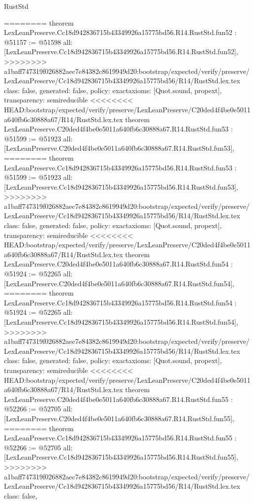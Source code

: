 \begin{lexlean}{RustStd}
\begin{coremodule}
{\begin{coremodule}
{{{{{{{{{{{{{{{{{{{{{{{{{{{{{{{{{{{{{{{{{{{{{{{{{{{{{{{========
theorem LexLeanPreserve.Cc18d942836715b43349926a15775bd56.R14.RustStd.fun52 : @51157 := @51598 {
  all: [LexLeanPreserve.Cc18d942836715b43349926a15775bd56.R14.RustStd.fun52],
>>>>>>>> a1baff747319f026882aec7e84382c8619949d20:bootstrap/expected/verify/preserve/LexLeanPreserve/Cc18d942836715b43349926a15775bd56/R14/RustStd.lex.tex
  class: false,
  generated: false,
  policy: exact{axioms: [Quot.sound, propext]},
  transparency: semireducible
}
<<<<<<<< HEAD:bootstrap/expected/verify/preserve/LexLeanPreserve/C20ded4f4be0e5011a640fb6c30888a67/R14/RustStd.lex.tex
theorem LexLeanPreserve.C20ded4f4be0e5011a640fb6c30888a67.R14.RustStd.fun53 : @51599 := @51923 {
  all: [LexLeanPreserve.C20ded4f4be0e5011a640fb6c30888a67.R14.RustStd.fun53],
========
theorem LexLeanPreserve.Cc18d942836715b43349926a15775bd56.R14.RustStd.fun53 : @51599 := @51923 {
  all: [LexLeanPreserve.Cc18d942836715b43349926a15775bd56.R14.RustStd.fun53],
>>>>>>>> a1baff747319f026882aec7e84382c8619949d20:bootstrap/expected/verify/preserve/LexLeanPreserve/Cc18d942836715b43349926a15775bd56/R14/RustStd.lex.tex
  class: false,
  generated: false,
  policy: exact{axioms: [Quot.sound, propext]},
  transparency: semireducible
}
<<<<<<<< HEAD:bootstrap/expected/verify/preserve/LexLeanPreserve/C20ded4f4be0e5011a640fb6c30888a67/R14/RustStd.lex.tex
theorem LexLeanPreserve.C20ded4f4be0e5011a640fb6c30888a67.R14.RustStd.fun54 : @51924 := @52265 {
  all: [LexLeanPreserve.C20ded4f4be0e5011a640fb6c30888a67.R14.RustStd.fun54],
========
theorem LexLeanPreserve.Cc18d942836715b43349926a15775bd56.R14.RustStd.fun54 : @51924 := @52265 {
  all: [LexLeanPreserve.Cc18d942836715b43349926a15775bd56.R14.RustStd.fun54],
>>>>>>>> a1baff747319f026882aec7e84382c8619949d20:bootstrap/expected/verify/preserve/LexLeanPreserve/Cc18d942836715b43349926a15775bd56/R14/RustStd.lex.tex
  class: false,
  generated: false,
  policy: exact{axioms: [Quot.sound, propext]},
  transparency: semireducible
}
<<<<<<<< HEAD:bootstrap/expected/verify/preserve/LexLeanPreserve/C20ded4f4be0e5011a640fb6c30888a67/R14/RustStd.lex.tex
theorem LexLeanPreserve.C20ded4f4be0e5011a640fb6c30888a67.R14.RustStd.fun55 : @52266 := @52705 {
  all: [LexLeanPreserve.C20ded4f4be0e5011a640fb6c30888a67.R14.RustStd.fun55],
========
theorem LexLeanPreserve.Cc18d942836715b43349926a15775bd56.R14.RustStd.fun55 : @52266 := @52705 {
  all: [LexLeanPreserve.Cc18d942836715b43349926a15775bd56.R14.RustStd.fun55],
>>>>>>>> a1baff747319f026882aec7e84382c8619949d20:bootstrap/expected/verify/preserve/LexLeanPreserve/Cc18d942836715b43349926a15775bd56/R14/RustStd.lex.tex
  class: false,
}}}}}}}}}}}}}}}}}}}}}}}}}}}}}}}}}}}}}}}}}}}}}}}}}}}}}}}}}}}
\end{coremodule}}
\end{coremodule}
\end{lexlean}
